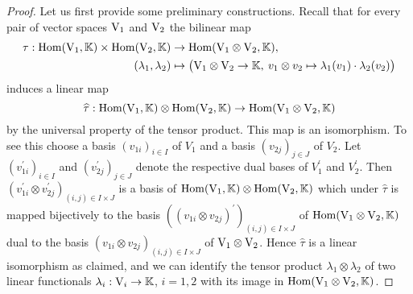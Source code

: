 \begin{proof}
  Let us first provide some preliminary constructions. 
  Recall that  for every pair of vector spaces $\mathrm{V}_1$ and $\mathrm{V}_2$
  the bilinear map 
  \begin{equation*}
    \begin{split}
    \tau: \operatorname{Hom}\nolimits (\mathrm{V}_1 ,\mathbb{K}) \times \operatorname{Hom}\nolimits (\mathrm{V}_2,\mathbb{K}) & \to
    \operatorname{Hom}\nolimits (\mathrm{V}_1 \otimes \mathrm{V}_2,\mathbb{K}), \\
    (\lambda_1,\lambda_2) & \mapsto \big( \mathrm{V}_1 \otimes \mathrm{V}_2 \to \mathbb{K}, \: 
    v_1 \otimes v_2 \mapsto \lambda_1 (v_1) \cdot\lambda_2 (v_2) \big)    
    \end{split}
  \end{equation*}
  induces a linear map
  \[
    \widehat{\tau}: \operatorname{Hom}\nolimits (\mathrm{V}_1 ,\mathbb{K}) \otimes \operatorname{Hom}\nolimits (\mathrm{V}_2,\mathbb{K}) \to
    \operatorname{Hom}\nolimits (\mathrm{V}_1 \otimes \mathrm{V}_2,\mathbb{K})  
  \]
  by the universal property of the tensor product.
  This map is an isomorphism. To see this choose a basis $(v_{1i})_{i\in I} $ of $V_1$ and
  a basis $(v_{2j})_{j\in J} $ of $V_2$. Let  $(v^\prime_{1i})_{i\in I} $ and $(v^\prime_{2j})_{j\in J} $
  denote the respective dual bases of $V_1^\prime$ and  $V_2^\prime$. Then
  $\left( v^\prime_{1i} \otimes v^\prime_{2j}\right)_{(i,j)\in I \times J}$ is a basis of
  $\operatorname{Hom}\nolimits (\mathrm{V}_1 ,\mathbb{K}) \otimes \operatorname{Hom}\nolimits (\mathrm{V}_2,\mathbb{K})$ which under $\widehat{\tau}$
  is  mapped bijectively to the basis $\left( (v_{1i} \otimes v_{2j})^\prime \right)_{(i,j)\in I \times J}$
  of $\operatorname{Hom}\nolimits (\mathrm{V}_1 \otimes \mathrm{V}_2,\mathbb{K})$ dual to the basis
  $\left( v_{1i} \otimes v_{2j}\right)_{(i,j)\in I \times J}$ of $\mathrm{V}_1 \otimes \mathrm{V}_2$.
  Hence $\widehat{\tau}$ is a linear isomorphism as claimed, and we can identify
  the tensor product $\lambda_1\otimes \lambda_2$ of two linear functionals
  $\lambda_i: \mathrm{V}_i\to\mathbb{K}$, $i=1,2$ 
  with its image in $\operatorname{Hom}\nolimits (\mathrm{V}_1 \otimes \mathrm{V}_2,\mathbb{K})$.  
 

\end{proof}
